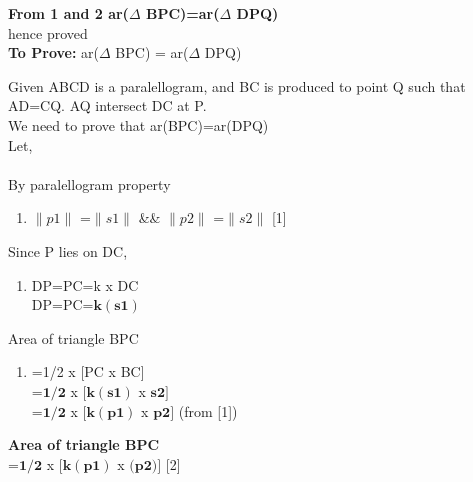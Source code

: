 \documentclass[journal,12pt,twocolumn]{IEEEtran}
\begin{document}
\begin{tableofcontents}
\textbf{From 1 and 2 ar($\Delta$ BPC)=ar($\Delta$ DPQ)}\\
hence proved\\
\justify
\textbf{To Prove:}
ar($\Delta$ BPC) = ar($\Delta$ DPQ)
\begin{flushleft}
Given ABCD is a paralellogram, and BC is produced to point Q such that AD=CQ. AQ intersect DC at P.\\
We need to prove that ar(BPC)=ar(DPQ)\\
Let,\hfill \\
\\
\justify
\vspace{0.1cm}
By paralellogram property\\
\begin{enumerate}
\item[]
$\lVert{p1}\rVert$ =$\lVert{s1}\rVert$ \&\& $\lVert{p2}\rVert$ =$\lVert{s2}\rVert $ \hspace{1.2cm}[1]\\
\end{enumerate}
\vspace{3cm}
Since P lies on DC,\\
\begin{enumerate}
\item[]
DP=PC=k x DC\\
DP=PC=$\boldsymbol{k(s1)}$\\
\end{enumerate}
Area of triangle BPC \\
\begin{enumerate}
\item[]
=1/2 x [PC x BC] \\
=$\boldsymbol{1/2}$ x $\boldsymbol{[k(s1)}$ x $\boldsymbol{s2]}$ \\
=$\boldsymbol{1/2}$ x $\boldsymbol{[k(p1)}$ x $\boldsymbol{p2]}$ (from [1])\\
\end{enumerate}
\textbf{Area of triangle BPC}\\
\vspace{0.1cm}
=$\boldsymbol{1/2}$ x $\boldsymbol{[k(p1)}$ x $\boldsymbol{(p2})]$  \hspace{2.5cm}[2]\\

\end{flushleft}
\end{tableofcontents}
\end{document}
